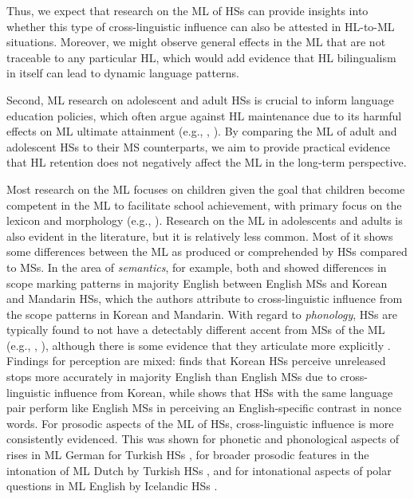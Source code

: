 \documentclass[output=paper,colorlinks,citecolor=brown]{langscibook}
\begin{document}
Thus, we expect that research on the ML of HSs can provide insights into whether this type of cross-linguistic influence can also be attested in HL-to-ML situations. Moreover, we might observe general effects in the ML that are not traceable to any particular HL, which would add evidence that HL bilingualism in itself can lead to dynamic language patterns.

Second, ML research on adolescent and adult HSs is crucial to inform language education policies, which often argue against HL maintenance due to its harmful effects on ML ultimate attainment (e.g., \cite{mccardle2015}, \cite[30--33]{tracy2023}). By comparing the ML of adult and adolescent HSs to their MS counterparts, we aim to provide practical evidence that HL retention does not negatively affect the ML in the long-term perspective.

Most research on the ML focuses on children given the goal that children become competent in the ML to facilitate school achievement, with primary focus on the lexicon and morphology (e.g., \cite{Bialystok2010, Marinis2010, Paradis2017}). Research on the ML in adolescents and adults is also evident in the literature, but it is relatively less common. Most of it shows some differences between the ML as produced or comprehended by HSs compared to MSs. In the area of \textit{semantics}, for example, both \citet{Scontras2017} and \citet{Lee2011} showed differences in scope marking patterns in majority English between English MSs and Korean and Mandarin HSs, which the authors attribute to cross-linguistic influence from the scope patterns in Korean and Mandarin. With regard to \textit{phonology}, HSs are typically found to not have a detectably different accent from MSs of the ML (e.g., \cite{Kupisch2014a}, \cite{Lloyd-Smith2020}), although there is some evidence that they articulate more explicitly \parencite[142--144]{Polinsky2018book}. Findings for perception are mixed: \citet{Chang2016} finds that Korean HSs perceive unreleased stops more accurately in majority English than English MSs due to cross-linguistic influence from Korean, while \citet{Lee-Ellis2012} shows that HSs with the same language pair perform like English MSs in perceiving an English-specific contrast in nonce words. For prosodic aspects of the ML of HSs, cross-linguistic influence is more consistently evidenced. This was shown for phonetic and phonological aspects of rises in ML German for Turkish HSs \parencite{queen2012}, for broader prosodic features in the intonation of ML Dutch by Turkish HSs \parencite{VanRijswijk2017}, and for intonational aspects of polar questions in ML English by Icelandic HSs \parencite{Dehe2018}. 
 
\end{document}
